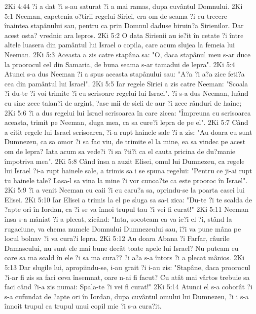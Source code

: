 2Ki 4:44  ?i a dat ?i s-au saturat ?i a mai ramas, dupa cuvântul Domnului.
2Ki 5:1  Neeman, capetenia o?tirii regelui Siriei, era om de seama ?i cu trecere înaintea stapânului sau, pentru ca prin Domnul daduse biruin?a Sirienilor. Dar acest osta? vrednic ara lepros.
2Ki 5:2  O data Sirienii au ie?it în cetate ?i între altele luasera din pamântul lui Israel o copila, care acum slujea la femeia lui Neeman.
2Ki 5:3  Aceasta a zis catre stapâna sa: "O, daca stapânul meu s-ar duce la proorocul cel din Samaria, de buna seama s-ar tamadui de lepra".
2Ki 5:4  Atunci s-a dus Neeman ?i a spus aceasta stapânului sau: "A?a ?i a?a zice feti?a cea din pamântul lui Israel".
2Ki 5:5  Iar regele Siriei a zis catre Neeman: "Scoala ?i du-te ?i voi trimite ?i eu scrisoare regelui lui Israel". ?i s-a dus Neeman, luând cu sine zece talan?i de argint, ?ase mii de sicli de aur ?i zece rânduri de haine;
2Ki 5:6  ?i a dus regelui lui Israel scrisoarea în care zicea: "Împreuna cu scrisoarea aceasta, trimit pe Neeman, sluga mea, ca sa cure?i lepra de pe el".
2Ki 5:7  Când a citit regele lui Israel scrisoarea, ?i-a rupt hainele sale ?i a zis: "Au doara eu sunt Dumnezeu, ca sa omor ?i sa fac viu, de trimite el la mine, ea sa vindec pe acest om de lepra? Iata acum sa vede?i ?i sa ?ti?i ca el cauta pricina de du?manie împotriva mea".
2Ki 5:8  Când însa a auzit Elisei, omul lui Dumnezeu, ca regele lui Israel ?i-a rupt hainele sale, a trimis sa i se spuna regelui: "Pentru ce ji-ai rupt tu hainele tale? Lasa-l sa vina la mine ?i vor cunoa?te ca este prooroc în Israel".
2Ki 5:9  ?i a venit Neeman cu caii ?i cu caru?a sa, oprindu-se la poarta casei lui Elisei.
2Ki 5:10  Iar Elisei a trimis la el pe sluga sa sa-i zica: "Du-te ?i te scalda de ?apte ori în Iordan, ca ?i se va înnoi trupul tau ?i vei fi curat!"
2Ki 5:11  Neeman însa s-a mâniat ?i a plecat, zicând: "Iata, socoteam ca va ie?i el ?i, stând la rugaciune, va chema numele Domnului Dumnezeului sau, î?i va pune mâna pe locul bolnav ?i va cura?i lepra.
2Ki 5:12  Au doara Abana ?i Farfar, râurile Damascului, nu sunt ele mai bune decât toate apele lui Israel? Nu puteam eu oare sa ma scald în ele ?i sa ma cura?? ?i a?a s-a întors ?i a plecat mânios.
2Ki 5:13  Dar slugile lui, apropiindu-se, i-au grait ?i i-au zis: "Stapâne, daca proorocul ?i-ar fi zis sa faci ceva însemnat, oare n-ai fi facut? Cu atât mai vârtos trebuie sa faci când ?i-a zis numai: Spala-te ?i vei fi curat!"
2Ki 5:14  Atunci el s-a coborât ?i s-a cufundat de ?apte ori în Iordan, dupa cuvântul omului lui Dumnezeu, ?i i s-a înnoit trupul ca trupul unui copil mic ?i s-a cura?it.
